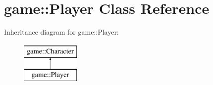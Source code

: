 \hypertarget{classgame_1_1_player}{\section{game\-:\-:Player Class Reference}
\label{classgame_1_1_player}
}
Inheritance diagram for game\-:\-:Player\-:\begin{figure}[H]
\begin{center}
\leavevmode
\includegraphics[height=2.000000cm]{classgame_1_1_player}
\end{center}
\end{figure}
